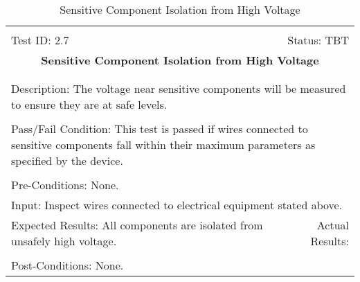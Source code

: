 \documentclass[titlepage]{article}
\begin{document}
\begin{center}%
\begin{table}[h!]
\begin{tabular}{|l r|}\hline&\\[-2mm]
	Test ID: 2.7	&Status: TBT\\[-3mm]
	\multicolumn{2}{|c|}{\textbf{\large{Sensitive Component Isolation from High Voltage}}}\\&\\\hline&\\[-3mm]
	\multicolumn{2}{|p{\textwidth}|}{Description: The voltage near sensitive components will be measured to ensure they are at safe levels.}\\[1mm]\hline&\\[-3mm]
	\multicolumn{2}{|p{\textwidth}|}{Pass/Fail Condition: This test is passed if wires connected to sensitive components fall within their maximum parameters as specified by the device.}\\[1mm]\hline&\\[-3mm]
	\multicolumn{2}{|p{\textwidth}|}{Pre-Conditions: None.}\\[4mm]
	\multicolumn{2}{|p{\textwidth}|}{Input: Inspect wires connected to electrical equipment stated above.}\\[2mm]\hline
	\multicolumn{1}{|p{0.49\textwidth}}{Expected Results: All components are isolated from unsafely high voltage.}	&\multicolumn{1}{|p{0.45\textwidth}|}{Actual Results:}\\\hline&\\[-3mm]
	\multicolumn{2}{|p{\textwidth}|}{Post-Conditions: None.}\\\hline
\end{tabular}
\caption{Sensitive Component Isolation from High Voltage}
\end{table}
\end{center}
\end{document}
